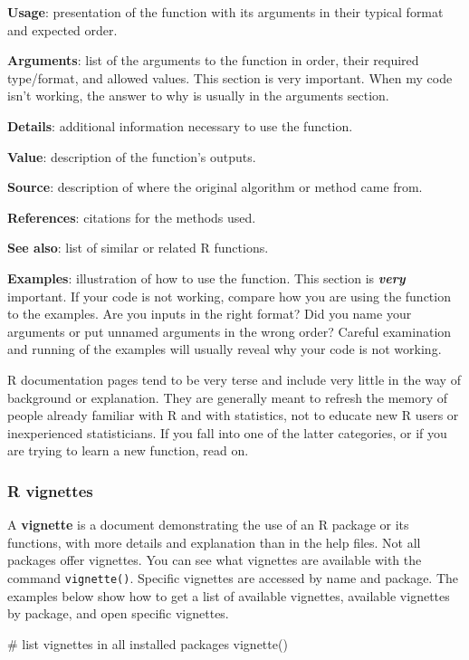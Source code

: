 \documentclass[
  13,
  letterpaper,
]{report}
\newenvironment{Shaded}{\begin{snugshade}}{\end{snugshade}}
\newcommand{\CommentTok}[1]{\textcolor[rgb]{0.37,0.37,0.37}{#1}}
\newcommand{\FunctionTok}[1]{\textcolor[rgb]{0.28,0.35,0.67}{#1}}
\newcommand{\NormalTok}[1]{\textcolor[rgb]{0.00,0.23,0.31}{#1}}
\begin{document}
\textbf{Usage}: presentation of the function with its arguments in their
typical format and expected order.

\textbf{Arguments}: list of the arguments to the function in order,
their required type/format, and allowed values. This section is very
important. When my code isn't working, the answer to why is usually in
the arguments section.

\textbf{Details}: additional information necessary to use the function.

\textbf{Value}: description of the function's outputs.

\textbf{Source}: description of where the original algorithm or method
came from.

\textbf{References}: citations for the methods used.

\textbf{See also}: list of similar or related R functions.

\textbf{Examples}: illustration of how to use the function. This section
is \textbf{\emph{very}} important. If your code is not working, compare
how you are using the function to the examples. Are you inputs in the
right format? Did you name your arguments or put unnamed arguments in
the wrong order? Careful examination and running of the examples will
usually reveal why your code is not working.

R documentation pages tend to be very terse and include very little in
the way of background or explanation. They are generally meant to
refresh the memory of people already familiar with R and with
statistics, not to educate new R users or inexperienced statisticians.
If you fall into one of the latter categories, or if you are trying to
learn a new function, read on.

\subsubsection{R vignettes}\label{sec-02-faq-help-vig}

A \textbf{vignette} is a document demonstrating the use of an R package
or its functions, with more details and explanation than in the help
files. Not all packages offer vignettes. You can see what vignettes are
available with the command \texttt{vignette()}. Specific vignettes are
accessed by name and package. The examples below show how to get a list
of available vignettes, available vignettes by package, and open
specific vignettes.

\begin{Shaded}
\begin{Highlighting}[]
\CommentTok{\# list vignettes in all installed packages}
\FunctionTok{vignette}\NormalTok{()}
\end{Highlighting}
\end{Shaded}
\end{document}
